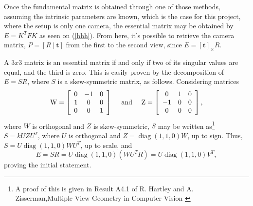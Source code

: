 Once the fundamental matrix is obtained through one of those methods, assuming the intrinsic parameters are known, which is the case for this project, where the setup is only one camera, the essential matrix may be obtained by $E = K^{T}  F K$ as seen on (\ref{hhh}).
From here, it's possible to retrieve the camera matrix, $P = [R \ | \ \mathbf{t}]$ from the first to the second view, since $E = [\mathbf{t}]_\times R$. 

A $3x3$ matrix is an essential matrix if and only if two of its singular values are equal, and the third is zero. This is easily proven by the decomposition of $E = SR$, where $S$ is a skew-symmetric matrix, as follows.
Considering matrices 
\begin{equation}
\mathrm { W } = \left[ \begin{array} { c c c } { 0 } & { - 1 } & { 0 } \\ { 1 } & { 0 } & { 0 } \\ { 0 } & { 0 } & { 1 } \end{array} \right] \quad \text { and } \quad \mathrm { Z } = \left[ \begin{array} { c c c } { 0 } & { 1 } & { 0 } \\ { - 1 } & { 0 } & { 0 } \\ { 0 } & { 0 } & { 0 } \end{array} \right],
\end{equation}
where $W$ is orthogonal and $Z$ is skew-symmetric, $S$ may be written as\footnote{A proof of this is given in Result A4.1 of R. Hartley and A. Zisserman,Multiple View Geometry in Computer Vision \cite{epipolar}} $S = kUZU^T$, where $U$ is orthogonal and $Z = \operatorname{diag}(1,1,0)W$, up to sign. Thus, $S = U \operatorname { diag } ( 1,1,0 ) WU^T$, up to scale, and 
\begin{equation}
E = SR = U \operatorname { diag } ( 1,1,0 ) \left( WU^T R \right) = U \operatorname { diag } ( 1,1,0 ) V^T,
\end{equation}
proving the initial statement.

